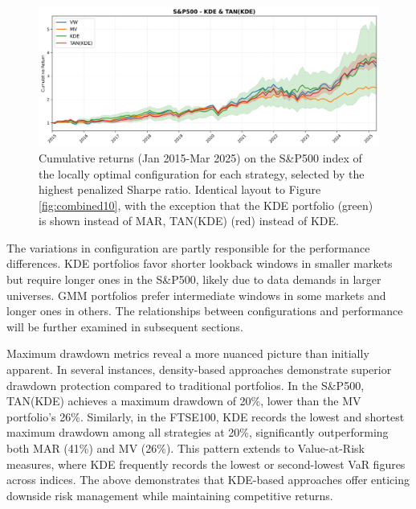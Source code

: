 \vspace{5mm}
\begin{figure}[H]
  \begin{center}
  \begin{minipage}{1\textwidth}
    \centering
    \includegraphics[width=\textwidth]{images/40_12.png}
  \end{minipage}
  \caption[Local best configuration - S\&P500 - Cumulative returns]{Cumulative returns (Jan 2015-Mar 2025) on the S\&P500 index of the locally optimal configuration for each strategy, selected by the highest penalized Sharpe ratio. Identical layout to Figure \ref{fig:combined10}, with the exception that the KDE portfolio (green) is shown instead of MAR, TAN(KDE) (red) instead of KDE.}
  \label{fig:combined12}
  \end{center}
  \end{figure}

The variations in configuration are partly responsible for the performance differences. KDE portfolios favor shorter lookback windows in smaller markets but require longer ones in the S\&P500, likely due to data demands in larger universes. GMM portfolios prefer intermediate windows in some markets and longer ones in others. The relationships between configurations and performance will be further examined in subsequent sections.

Maximum drawdown metrics reveal a more nuanced picture than initially apparent. In several instances, density-based approaches demonstrate superior drawdown protection compared to traditional portfolios. In the S\&P500, TAN(KDE) achieves a maximum drawdown of 20\%, lower than the MV portfolio's 26\%. Similarly, in the FTSE100, KDE records the lowest and shortest maximum drawdown among all strategies at 20\%, significantly outperforming both MAR (41\%) and MV (26\%). This pattern extends to Value-at-Risk measures, where KDE frequently records the lowest or second-lowest VaR figures across indices. The above demonstrates that KDE-based approaches offer enticing downside risk management while maintaining competitive returns.

